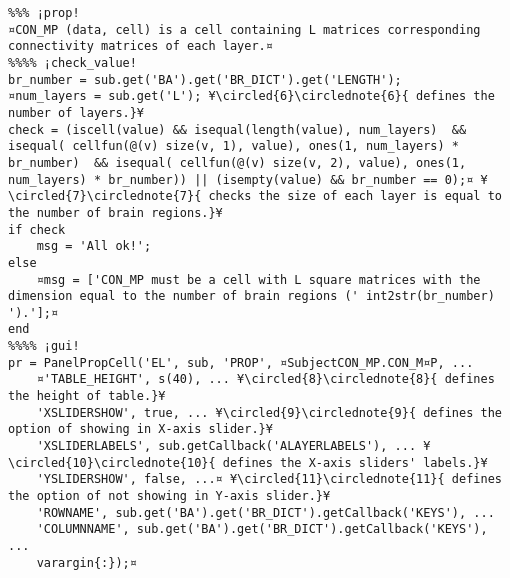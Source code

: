 \documentclass{tufte-handout}
\begin{document}
\begin{lstlisting}
%%% ¡prop!
¤CON_MP (data, cell) is a cell containing L matrices corresponding connectivity matrices of each layer.¤
%%%% ¡check_value!
br_number = sub.get('BA').get('BR_DICT').get('LENGTH');
¤num_layers = sub.get('L'); ¥\circled{6}\circlednote{6}{ defines the number of layers.}¥
check = (iscell(value) && isequal(length(value), num_layers)  && isequal( cellfun(@(v) size(v, 1), value), ones(1, num_layers) * br_number)  && isequal( cellfun(@(v) size(v, 2), value), ones(1, num_layers) * br_number)) || (isempty(value) && br_number == 0);¤ ¥\circled{7}\circlednote{7}{ checks the size of each layer is equal to the number of brain regions.}¥
if check
    msg = 'All ok!';
else   
    ¤msg = ['CON_MP must be a cell with L square matrices with the dimension equal to the number of brain regions (' int2str(br_number) ').'];¤
end
%%%% ¡gui! 
pr = PanelPropCell('EL', sub, 'PROP', ¤SubjectCON_MP.CON_M¤P, ...
    ¤'TABLE_HEIGHT', s(40), ... ¥\circled{8}\circlednote{8}{ defines the height of table.}¥
    'XSLIDERSHOW', true, ... ¥\circled{9}\circlednote{9}{ defines the option of showing in X-axis slider.}¥
    'XSLIDERLABELS', sub.getCallback('ALAYERLABELS'), ... ¥\circled{10}\circlednote{10}{ defines the X-axis sliders' labels.}¥
    'YSLIDERSHOW', false, ...¤ ¥\circled{11}\circlednote{11}{ defines the option of not showing in Y-axis slider.}¥
    'ROWNAME', sub.get('BA').get('BR_DICT').getCallback('KEYS'), ...
    'COLUMNNAME', sub.get('BA').get('BR_DICT').getCallback('KEYS'), ...
    varargin{:});¤

\end{lstlisting}
\end{document}
